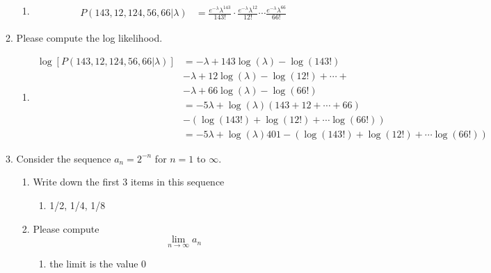 \documentclass[krantz1,ChapterTOCs]{krantz}
\begin{document}
\begin{enumerate}
\begin{enumerate}
        \begin{enumerate}
            \item {\color{red} 
                \begin{align*}
                    P(143, 12, 124, 56, 66 | \lambda) &= \frac{e^{-\lambda} \lambda^{143}}{143!} \cdot \frac{e^{-\lambda} \lambda^{12}}{12!} \cdots \frac{e^{-\lambda} \lambda^{66}}{66!} 
                \end{align*}
        }
        \end{enumerate}
        \item Please compute the log likelihood.
        \begin{enumerate}
            \item {\color{red} 
                \begin{align*}
                    \log\left[P(143, 12, 124, 56, 66 | \lambda)\right] &= -\lambda + 143 \log(\lambda) - \log(143!)\\
                    &-\lambda + 12 \log(\lambda) - \log(12!) + \cdots +\\ &-\lambda + 66 \log(\lambda) - \log(66!)\\
                    &=-5\lambda + \log(\lambda)(143+12+\cdots+66)\\ 
                    &- (\log(143!) + \log(12!) + \cdots \log(66!) )\\
                    &= -5\lambda + \log(\lambda) 401 - (\log(143!) + \log(12!) + \cdots \log(66!) )
                \end{align*}
        }
        \end{enumerate}
        
    \item Consider the sequence $a_{n} = 2^{-n}$ for $n=1$ to $\infty$. 
    \begin{enumerate}
        \item Write down the first 3 items in this sequence 
        
        \begin{enumerate}
            \item  {\color{red} 1/2, 1/4, 1/8  }
        \end{enumerate}
        
        \item Please compute \[ \lim_{n \to \infty} a_{n} \]
        
        \begin{enumerate}
            \item  {\color{red} the limit is the value 0  }
        \end{enumerate}
        

\end{enumerate}
\end{enumerate}
\end{enumerate}
\end{document}

